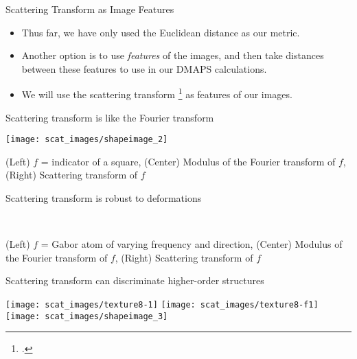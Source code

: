 \begin{frame}{Scattering Transform as Image Features}

{\small 
\begin{itemize}
	\item Thus far, we have only used the Euclidean distance as our metric.
	\item Another option is to use {\em features} of the images, and then take distances between these features to use in our DMAPS calculations.
	\item 
	We will use the scattering transform \footcite{bruna2012invariant} as features of our images.
\end{itemize}
\par}
\vspace{-0.15in}
\begin{minipage}{0.55\textwidth}
\begin{block}{{\small Scattering transform is like the Fourier transform \par}}
\centering 
\texttt{[image: scat\_images/shapeimage\_2]}\\
{\tiny (Left) $f$ = indicator of a square, (Center) Modulus of the Fourier transform of $f$, (Right) Scattering transform of $f$ \par}
\end{block}

\vspace{-0.1in}
\begin{block}{{\small Scattering transform is robust to deformations \par}}
\centering
{}\\
{\tiny (Left) $f$ = Gabor atom of varying frequency and direction, (Center) Modulus of the Fourier transform of $f$, (Right) Scattering transform of $f$ \par}
\end{block}

\end{minipage}
\hfill
\begin{minipage}{0.4\textwidth}
\begin{block}{{\small Scattering transform can discriminate higher-order structures \par}}
\texttt{[image: scat\_images/texture8-1]}
\texttt{[image: scat\_images/texture8-f1]}
\texttt{[image: scat\_images/shapeimage\_3]}


\end{block}
\end{minipage}
\end{frame}
